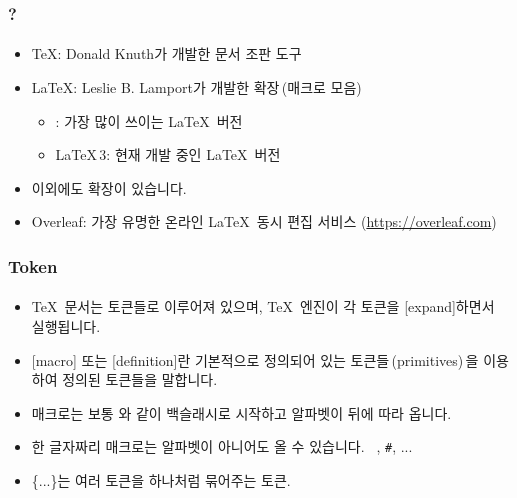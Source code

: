   
  \begin{frame}
    \frametitle{?}
    \framesubtitle{}
    \begin{itemize}
      \item \TeX: Donald Knuth가 개발한 문서 조판 도구
      \item \LaTeX: Leslie B. Lamport가 개발한  확장\,(매크로 모음)
      \begin{itemize}
        \item \LaTeXe: 가장 많이 쓰이는 \LaTeX\ 버전
        \item \LaTeX\,3: 현재 개발 중인 \LaTeX\ 버전
      \end{itemize}
      \item 이외에도  확장이 있습니다.
      \item Overleaf: 가장 유명한 온라인 \LaTeX\ 동시 편집 서비스 (\url{https://overleaf.com})
    \end{itemize}
  \end{frame}
  
  \makeatletter
  \NewDocumentCommand\newterm{m o}{%
    \textbf{#1}%
    \IfNoValueF{#2}{\kern1pt{\small(#2)}\expandafter\ltx@ifnextchar@nospace{ }{}{\kern1pt}}%
  }
  \makeatother
  
  \begin{frame}[fragile]
    \frametitle{Token}
    \framesubtitle{}
    \begin{itemize}
      \item \TeX\ 문서는 토큰들로 이루어져 있으며, \TeX\ 엔진이 각 토큰을 [expand]하면서 실행됩니다.
      \item {}[macro] 또는 [definition]란 기본적으로 정의되어 있는 토큰들{\,\small(primitives)\,}을 이용하여 정의된 토큰들을 말합니다.
      \item 매크로는 보통 \texttt{\macro}와 같이 백슬래시로 시작하고 알파벳이 뒤에 따라 옵니다.
      \item 한 글자짜리 매크로는 알파벳이 아니어도 올 수 있습니다. \texttt{\ }, \texttt{\#}, ...
      \item \{...\}는 여러 토큰을 하나처럼 묶어주는 토큰.
    \end{itemize}
  \end{frame}
  
